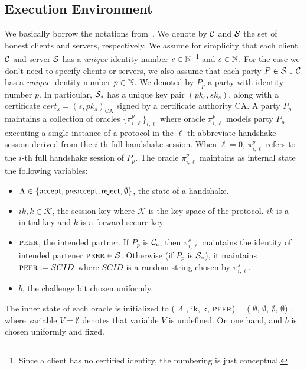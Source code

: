 \subsection{Execution Environment} \label{sec:exec_env_party}
We basically borrow the notations from~\cite{JKSS12:ACCE,KPW13:SACCE}.
We denote by $\mathcal{C}$ and $\mathcal{S}$ the set of honest clients and servers, respectively.
We assume for simplicity that each client $\mathcal{C}$ and server $\mathcal{S}$ has a \textit{unique} identity number $c \in \mathbb{N}$~\footnote{Since a client has
no certified identity, the numbering is just conceptual.}
and $s \in \mathbb{N}$.
For the case we don't need to specify clients or servers, we also assume that each party $P \in \mathcal{S} \cup \mathcal{C}$ has a \textit{unique} identity number $p \in \mathbb{N}$.
We denoted by $P_p$ a party with identity number $p$.
In particular, $\mathcal{S}_s$ has a unique key pair $(pk_s, sk_s)$, along with a certificate $cert_s=(s,pk_s)_{\text{CA}}$
signed by a certificate authority CA.
A party $P_p$ maintains a collection of oracles $\{\pi^p_{i,\ell }\}_{i,\ell}$
where oracle $\pi^p_{i, \ell}$ models party $P_p$ executing a single instance of a protocol in the $\ell$-th abbreviate handshake session
derived from  the $i$-th full handshake session.
When $\ell=0$, $\pi^p_{i,\ell}$ refers to the $i$-th full handshake session of $P_p$.
The oracle $\pi^p_{i, \ell}$ maintains as internal state the following variables:

\begin{itemize}
 \item{$\Lambda \in \{\mathsf{accept}, \mathsf{preaccept}, \mathsf{reject}, \emptyset\}$, the state of a handshake.}
 \item{$ik, k \in \mathcal{K}$, the session key where $\mathcal{K}$ is the key space of the protocol. $ik$ is a initial key and $k$ is a forward secure key.}
 \item{$\textsc{peer}$, the intended partner. If $P_p$ is $\mathcal{C}_c$, then $\pi^c_{i,\ell}$ maintains the identity of intended partener $\textsc{peer} \in \mathcal{S}$. Otherwise (if $P_p$ is $\mathcal{S}_s$), it maintains $\textsc{peer}:=SCID$ where $SCID$ is a random string chosen by $\pi^s_{i,\ell}$.}
 \item{$b$, the challenge bit chosen uniformly.}
\end{itemize}
The inner state of each oracle is initialized to
 ( $\Lambda$ , ik, k, $\textsc{peer}$) = ( $\emptyset$, $\emptyset$, $\emptyset$, $\emptyset$) ,
where variable $V=\emptyset$ denotes that variable $V$ is undefined.
On one hand, and
$b$ is chosen uniformly and fixed.

